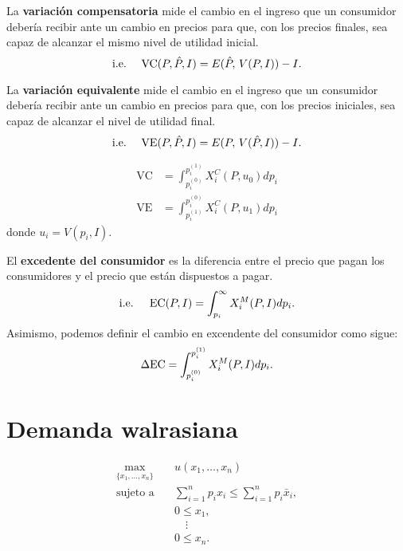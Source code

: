 \documentclass[8pt,a4paper]{extarticle}
\begin{document}
\begin{multicols}{3}
	\begin{boxdef}
		La \textbf{variación compensatoria} mide el cambio en el ingreso que un consumidor debería recibir ante un cambio en precios para que, con los precios finales, sea capaz de alcanzar el mismo nivel de utilidad inicial.
		\[
			\text{\normalfont i.e.}\quad \text{ \normalfont VC} (P, \hat{P}, I) = E(\hat{P}, \, V(P, I)) - I
			.\]
	\end{boxdef}

	\begin{boxdef}
		La \textbf{variación equivalente} mide el cambio en el ingreso que un consumidor debería recibir ante un cambio en precios para que, con los precios iniciales, sea capaz de alcanzar el nivel de utilidad final.
		\[
			\text{\normalfont i.e.}\quad \text{ \normalfont VE} (P, \hat{P}, I) = E(P, \, V(\hat{P}, I)) - I
			.\]
	\end{boxdef}

	\begin{boxtheo}
		\begin{equation*}
			\begin{aligned}
				\text{VC} & = \int_{p_i^{(0)}}^{p_i^{(1)}} X_i^C (P, u_0) dp_i \\
				\text{VE} & = \int_{p_i^{(1)}}^{p_i^{(0)}} X_i^C (P, u_1) dp_i
			\end{aligned}
		\end{equation*}
		donde $u_i = V(p_i, I)$.
	\end{boxtheo}

	\begin{boxdef}
		El \textbf{excedente del consumidor} es la diferencia entre el precio que pagan los consumidores y el precio que están dispuestos a pagar.
		\[
			\text{\normalfont i.e. \quad EC}(P, I) = \int_{p_i}^{\infty} X_i^M (P, I) dp_i
			.\]
		Asimismo, podemos definir el cambio en excendente del consumidor como sigue:
		\[
			\Delta \text{\normalfont EC} = \int_{p_i^{(0)}}^{p_i^{(1)}} X_i^M (P, I) dp_i
			.\]
	\end{boxdef}

	\newpage

	\section{Demanda walrasiana}

	\begin{equation*}
		\begin{aligned}
			\max_{\{x_1, \ldots, x_n\}}\	 & u(x_1, \ldots, x_n)                                      \\
			\text{sujeto a} \quad        & \sum_{i=1}^{n} p_i x_i \le \sum_{i=1}^{n} p_i \bar{x}_i, \\
			                             & 0 \le x_1,                                               \\
			                             & \quad \vdots                                             \\
			                             & 0 \le x_n.
		\end{aligned}
	\end{equation*}


\end{multicols}
\end{document}
